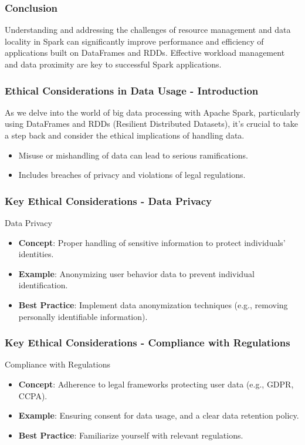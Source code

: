 \documentclass[aspectratio=169]{beamer}
\begin{document}
\begin{frame}[fragile]
  \frametitle{Conclusion}
  Understanding and addressing the challenges of resource management and data locality in Spark can significantly improve performance and efficiency of applications built on DataFrames and RDDs. Effective workload management and data proximity are key to successful Spark applications.
\end{frame}

\begin{frame}[fragile]
    \frametitle{Ethical Considerations in Data Usage - Introduction}
    As we delve into the world of big data processing with Apache Spark, particularly using DataFrames and RDDs (Resilient Distributed Datasets), it's crucial to take a step back and consider the ethical implications of handling data. 
    \begin{itemize}
        \item Misuse or mishandling of data can lead to serious ramifications.
        \item Includes breaches of privacy and violations of legal regulations.
    \end{itemize}
\end{frame}

\begin{frame}[fragile]
    \frametitle{Key Ethical Considerations - Data Privacy}
    \begin{block}{Data Privacy}
        \begin{itemize}
            \item \textbf{Concept}: Proper handling of sensitive information to protect individuals' identities.
            \item \textbf{Example}: Anonymizing user behavior data to prevent individual identification.
            \item \textbf{Best Practice}: Implement data anonymization techniques (e.g., removing personally identifiable information).
        \end{itemize}
    \end{block}
\end{frame}

\begin{frame}[fragile]
    \frametitle{Key Ethical Considerations - Compliance with Regulations}
    \begin{block}{Compliance with Regulations}
        \begin{itemize}
            \item \textbf{Concept}: Adherence to legal frameworks protecting user data (e.g., GDPR, CCPA).
            \item \textbf{Example}: Ensuring consent for data usage, and a clear data retention policy.
            \item \textbf{Best Practice}: Familiarize yourself with relevant regulations.
        \end{itemize}
    \end{block}
\end{frame}
\end{document}
